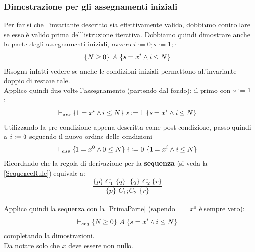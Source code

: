 \begin{esempio}
				      				\subsubsection{Dimostrazione per gli assegnamenti iniziali}
				      				Per far si che l'invariante descritto sia effettivamente valido, dobbiamo controllare se esso è valido prima dell'istruzione iterativa.
				      				Dobbiamo quindi dimostrare anche la parte degli assegnamenti iniziali, ovvero $i := 0; s := 1;$:
				      				\begin{align}
				      					\{N\geq 0\}\mbox{ \textit{A} }\{s=x^i\land i\leq N\} 
				      					\label{PrimaParte}                                   
				      				\end{align}
				      				Bisogna infatti vedere se anche le condizioni iniziali permettono
				      				all'invariante doppio di restare tale.\\
				      				Applico quindi due volte l'assegnamento (partendo dal fondo); il primo con
				      				$s\cceq 1$: 
				      				\[\vdash_{ass}\{1=x^i\land i\leq N\}\mbox{ $s\cceq 1$ }\{s=x^i\land i\leq N\}\]
				      				Utilizzando la pre-condizione appena descritta come post-condizione, passo quindi a $i\cceq 0$ seguendo il nuovo ordine delle condizioni:
				      				\[\vdash_{ass}\{1=x^0\land 0\leq N\}\mbox{ $i\cceq 0$ }\{1=x^i\land i\leq N\}\]
				      				Ricordando che la regola di derivazione per la \textbf{sequenza} (si veda la \ref{SequenceRule}) equivale a:   \[\frac{\{p\}\,\, C_1\,\,\{q\}\,\,
				      					\,\,\{q\}\,\, C_2\,\,\{r\}}{\{p\}\,\, C_1;C_2\,\,\{r\}}\] \\Applico quindi la sequenza con la \ref{PrimaParte} (sapendo $1=x^0$ è sempre vero):
				      				\[\vdash_{seq}\{N\geq 0\}\mbox{ \textit{A} }\{s=x^i\land i\leq N\}\]
				      				completando la dimostrazioni.\\
				      				Da notare solo che $x$ deve essere non nullo.
				      				\end{esempio}
